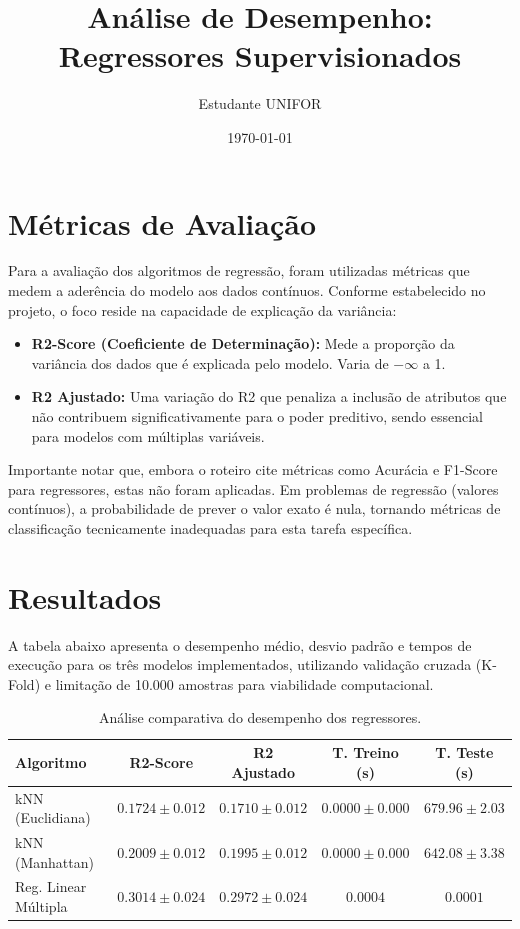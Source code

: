 \documentclass[12pt,a4paper]{article}
\title{Análise de Desempenho: Regressores Supervisionados}
\author{Estudante UNIFOR}
\date{\today}
\begin{document}
\maketitle

\section{Métricas de Avaliação}
Para a avaliação dos algoritmos de regressão, foram utilizadas métricas que medem a aderência do modelo aos dados contínuos. Conforme estabelecido no projeto, o foco reside na capacidade de explicação da variância:

\begin{itemize}
    \item \textbf{R2-Score (Coeficiente de Determinação):} Mede a proporção da variância dos dados que é explicada pelo modelo. Varia de $-\infty$ a 1.
    \item \textbf{R2 Ajustado:} Uma variação do R2 que penaliza a inclusão de atributos que não contribuem significativamente para o poder preditivo, sendo essencial para modelos com múltiplas variáveis.
\end{itemize}

Importante notar que, embora o roteiro cite métricas como Acurácia e F1-Score para regressores, estas não foram aplicadas. Em problemas de regressão (valores contínuos), a probabilidade de prever o valor exato é nula, tornando métricas de classificação tecnicamente inadequadas para esta tarefa específica.

\section{Resultados}
A tabela abaixo apresenta o desempenho médio, desvio padrão e tempos de execução para os três modelos implementados, utilizando validação cruzada (K-Fold) e limitação de 10.000 amostras para viabilidade computacional.

\begin{table}[H]
\centering
\caption{Análise comparativa do desempenho dos regressores.}
\label{tab:resultados}
\begin{tabular}{lcccc}
\toprule
\textbf{Algoritmo} & \textbf{R2-Score} & \textbf{R2 Ajustado} & \textbf{T. Treino (s)} & \textbf{T. Teste (s)} \\
\midrule
kNN (Euclidiana) & $0.1724 \pm 0.012$ & $0.1710 \pm 0.012$ & $0.0000 \pm 0.000$ & $679.96 \pm 2.03$ \\
kNN (Manhattan)  & $0.2009 \pm 0.012$ & $0.1995 \pm 0.012$ & $0.0000 \pm 0.000$ & $642.08 \pm 3.38$ \\
Reg. Linear Múltipla & $0.3014 \pm 0.024$ & $0.2972 \pm 0.024$ & $0.0004$ & $0.0001$ \\
\bottomrule
\end{tabular}
\end{table}
\end{document}
